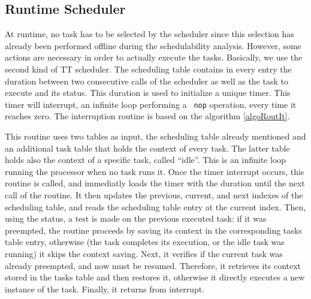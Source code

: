 \documentclass[conference,compsocconf]{IEEEtran}
\begin{document}
\subsection{Runtime Scheduler}
\label{rts}

At runtime, no task has to be selected by the scheduler since this selection
has already been performed offline during the schedulability analysis. However,
some actions are necessary in order to actually execute the tasks. Basically,
we use the second kind of TT scheduler. The scheduling table contains in every
entry the duration between two consecutive calls of the scheduler as well as
the task to execute and its status. This duration is used to initialize a
unique timer. This timer will interrupt, an infinite loop performing a {\tt
  nop} operation, every time it reaches zero. The interruption routine is based
on the algorithm \ref{algoRoutIt}.

This routine uses two tables as input, the scheduling table already mentioned
and an additional task table that holds the context of every task. The latter
table holds also the context of a specific task, called ``idle''. This is an
infinite loop running the processor when no task runs it. Once the timer
interrupt occurs, this routine is called, and immediatly loads the timer with
the duration until the next call of the routine. It then updates the previous,
current, and next indexes of the scheduling table, and reads the scheduling
table entry at the current index. Then, using the status, a test is made on the
previous executed task: if it was preempted, the routine proceeds by saving its
context in the corresponding tasks table entry, otherwise (the task completes
its execution, or the idle task was running) it skips the context saving. Next,
it verifies if the current task was already preempted, and now must be
resumed. Therefore, it retrieves its context stored in the tasks table and then
restores it, otherwise it directly executes a new instance of the task.
Finally, it returns from interrupt.
\end{document}
